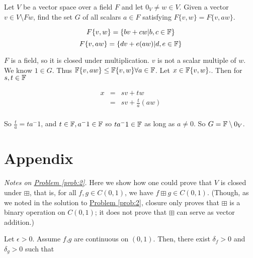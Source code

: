 \begin{problem}[Golan 105]

Let $V$ be a vector space over a field $F$ and let $0_V \neq w \in V$.  Given a
vector $v \in V \setminus Fw$, find the set $G$ of all scalars $a \in F$
satisfying $F\{v, w\} = F\{v, aw\}$.

\end{problem}
\smallskip
\begin{solution}

$$F\{v,w\} = \{bv + cw | b,c \in \mathbb{F} \} $$
$$F\{v,aw\} = \{dv + e(aw) | d,e \in \mathbb{F}\}$$

$F$ is a field, so it is closed under multiplication. $v$ is not a scalar multiple of $w$. We know $1 \in G$. Thus $\mathbb{F}\{v,aw\} \leq \mathbb{F}\{v,w\} \forall a \in \mathbb{F}$. Let $x \in \mathbb{F}\{v,w\}.$. Then for $s,t \in \mathbb{F}$

\begin{eqnarray*}
x & = & sv + tw  \\
  & = & sv + \frac{t}{a}(aw) \\
\end{eqnarray*}

So $\frac{t}{a} = ta^-1$, and $t \in \mathbb{F}, a^-1 \in \mathbb{F}$ so $ta^-1 \in \mathbb{F}$ as long as $a \neq 0$. So $G = \mathbb{F} \setminus 0_V$.
\end{solution}
\probskip


\section*{Appendix}
\label{appendix}

\noindent
{\it Notes on \hyperref[prob:2]{Problem \ref*{prob:2}}.}
Here we show how one could prove that $V$ is closed under $\boxplus$, that is, 
for all $f, g \in C(0,1)$, we have $f \boxplus g \in C(0,1)$. (Though, as we
noted in the solution to
\hyperref[prob:2]{Problem \ref*{prob:2}}, closure only proves that 
$\boxplus$ is a binary operation on $C(0,1)$; it does not prove that
$\boxplus$ can serve as vector addition.)

Let $\epsilon > 0$. Assume $f$,$g$ are continuous on $(0,1)$. Then, there exist $\delta_f > 0$ and $\delta_g > 0$ such that

